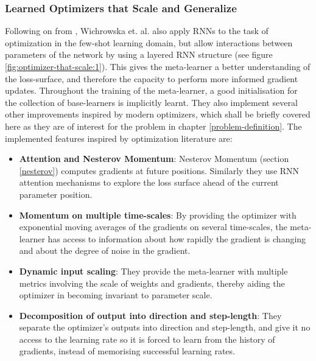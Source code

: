 \documentclass{report}
\begin{document}
\subsubsection{Learned Optimizers that Scale and Generalize}
Following on from \parencite{oaamffsl}, Wichrowska et. al. \parencite{lotsag} also apply RNNs to the task of optimization in the few-shot learning domain, but allow interactions between parameters of the network by using a layered RNN structure (see figure \ref{fig:optimizer-that-scale:1}). This gives the meta-learner a better understanding of the loss-surface, and therefore the capacity to perform more informed gradient updates. Throughout the training of the meta-learner, a good initialisation for the collection of base-learners is implicitly learnt. They also implement several other improvements inspired by modern optimizers, which shall be briefly covered here as they are of interest for the problem in chapter \ref{problem-definition}.
The implemented features inspired by optimization literature are:
\begin{itemize}
 \item\textbf{Attention and Nesterov Momentum}: Nesterov Momentum (section \ref{nesterov}) computes gradients at future positions. Similarly they use RNN attention mechanisms to explore the loss surface ahead of the current parameter position.
 \item\textbf{Momentum on multiple time-scales}: By providing the optimizer with exponential moving averages of the gradients on several time-scales, the meta-learner has access to information about how rapidly the gradient is changing and about the degree of noise in the gradient.
 \item\textbf{Dynamic input scaling}: They provide the meta-learner with multiple metrics involving the scale of weights and gradients, thereby aiding the optimizer in becoming invariant to parameter scale.
 \item\textbf{Decomposition of output into direction and step-length}: They separate the optimizer's outputs into direction and step-length, and give it no access to the learning rate so it is forced to learn from the history of gradients, instead of memorising successful learning rates.
\end{itemize}
\end{document}
